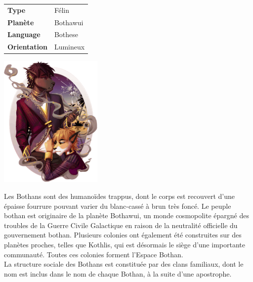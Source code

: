 \begin{flushright}
\begin{tabular}{ l l }
	\textbf{Type} 			& Félin \\
   	\textbf{Planète} 		& Bothawui \\
   	\textbf{Language} 		& Bothese \\
   	\textbf{Orientation} 	& Lumineux \\
\end{tabular}
\end{flushright}

\vspace{-55}
\includegraphics[width=5cm]{img/races/bothan.png}

Les Bothans sont des humanoïdes trappus, dont le corps est recouvert d'une épaisse fourrure pouvant varier du blanc-cassé à brun très foncé.
Le peuple bothan est originaire de la planète Bothawui, un monde cosmopolite épargné des troubles de la Guerre Civile Galactique en raison de la neutralité officielle du gouvernement bothan. Plusieurs colonies ont également été construites sur des planètes proches, telles que Kothlis, qui est désormais le siège d'une importante communauté. Toutes ces colonies forment l'Espace Bothan.\\
La structure sociale des Bothans est constituée par des clans familiaux, dont le nom est inclus dans le nom de chaque Bothan, à la suite d'une apostrophe.

